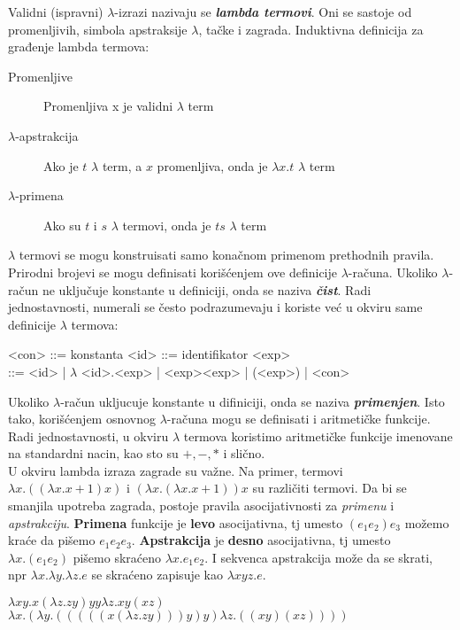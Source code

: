 \documentclass[../main.tex]{subfiles}
\begin{document}
Validni (ispravni) $\lambda$-izrazi nazivaju se {\it\bf lambda termovi}. Oni se sastoje od promenljivih, simbola apstraksije $\lambda$, tačke i zagrada. Induktivna definicija za građenje lambda termova:
\begin{description}
\item[Promenljive] Promenljiva x je validni $\lambda$ term
\item[$\lambda$-apstrakcija] Ako je $t$ $\lambda$ term, a $x$ promenljiva, onda je $\lambda x.t$ $\lambda$ term
\item[$\lambda$-primena] Ako su $t$ i $s$ $\lambda$ termovi, onda je $ts$ $\lambda$ term
\end{description}
$\lambda$ termovi se mogu konstruisati samo konačnom primenom prethodnih pravila.
\\
Prirodni brojevi se mogu definisati korišćenjem ove definicije $\lambda$-računa. Ukoliko $\lambda$-račun ne uključuje konstante u definiciji, onda se naziva {\it\bf čist}. Radi jednostavnosti, numerali se često podrazumevaju i koriste već u okviru same definicije $\lambda$ termova:
\begin{boxprimer}
<con> ::= konstanta <id> ::= identifikator <exp>\\
\hspace*{4.2cm} ::= <id> | $\lambda$ <id>.<exp> | <exp><exp> | (<exp>) | <con>
\end{boxprimer}

Ukoliko $\lambda$-račun ukljucuje konstante u difiniciji, onda se naziva {\it\bf primenjen}. Isto tako, korišćenjem osnovnog $\lambda$-računa mogu se definisati i aritmetičke funkcije. Radi jednostavnosti, u okviru $\lambda$ termova koristimo aritmetičke funkcije imenovane na standardni nacin, kao sto su $+,-,*$ i slično.
\\
U okviru lambda izraza zagrade su važne. Na primer, termovi $\lambda x.((\lambda x.x+1)x)$ i $(\lambda x.(\lambda x.x+1))x$ su različiti termovi. Da bi se smanjila upotreba zagrada, postoje pravila asocijativnosti za {\it primenu} i {\it apstrakciju}. {\bf Primena} funkcije je {\bf levo} asocijativna, tj umesto $(e_1 e_2)e_3$ možemo kraće da pišemo $e_1e_2e_3$. {\bf Apstrakcija} je {\bf desno} asocijativna, tj umesto $\lambda x.(e_1 e_2)$ pišemo skraćeno $\lambda x.e_1 e_2$. I sekvenca apstrakcija može da se skrati, npr $\lambda x.\lambda y.\lambda z.e$ se skraćeno zapisuje kao $\lambda xyz.e$.
\\
\begin{boxprimer}[width=.6\linewidth]
\begin{center}
$\lambda xy.x(\lambda z.zy)yy\lambda z.xy(xz)$\\
$\lambda x.(\lambda y.(((((x(\lambda z.zy)))y)y)\lambda z.((xy)(xz))))$ %
\end{center}
\end{boxprimer}
\end{document}

